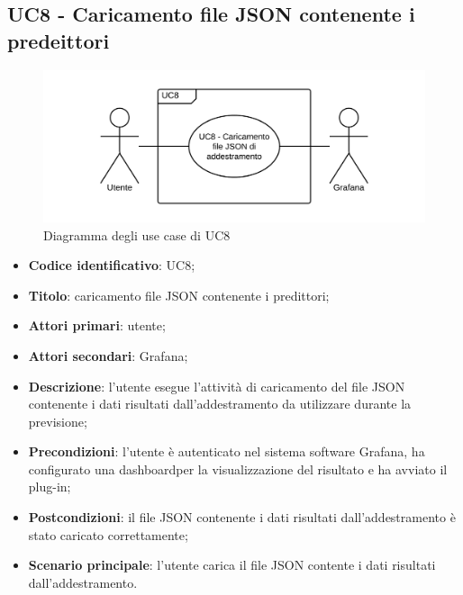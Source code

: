 \subsection{UC8 - Caricamento file JSON contenente i predeittori}
\begin{figure}[H]
\includegraphics{img/UC8_-_Caricamento_file_JSON_di_addestramento.png}
\caption{Diagramma degli use case di UC8}
\end{figure}
\begin{itemize}
	\item \textbf{Codice identificativo}: UC8;
	\item \textbf{Titolo}: caricamento file JSON contenente i predittori;
	\item \textbf{Attori primari}: utente;
	\item \textbf{Attori secondari}: Grafana\glo;
	\item \textbf{Descrizione}: l'utente esegue l'attività di caricamento del file JSON contenente i dati risultati dall'addestramento da utilizzare durante la previsione;
	\item \textbf{Precondizioni}: l'utente è autenticato nel sistema software Grafana\glosp, ha configurato una dashboard\glosp per la visualizzazione del risultato e ha avviato il plug-in;
	\item \textbf{Postcondizioni}: il file JSON contenente i dati risultati dall'addestramento è stato caricato correttamente;
	\item \textbf{Scenario principale}: l'utente carica il file JSON contente i dati risultati dall'addestramento.
\end{itemize}